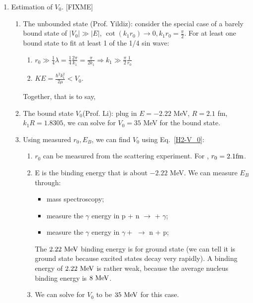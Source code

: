 \documentclass{school-22.101-notes}
\begin{document}
\begin{enumerate}
\item Estimation of $V_0$.  [FIXME] 
  \begin{enumerate}
  \item The unbounded state (Prof. Yildiz):  consider the special case of a barely bound state of $|V_0| \gg |E|$, $\cot (k_1 r_0) \to 0, k_1 r_0 = \frac{\pi}{2}$. For at least one bound state to fit at least 1 of the 1/4 sin wave: 
    \begin{enumerate}
    \item $ r_0 \gg \frac{1}{4}\lambda = \frac{1}{4}\frac{2 \pi}{k_1}  = \frac{\pi}{2k_1}  \Rightarrow k_1 \gg \frac{\pi}{2} \frac{1}{r_0} $
    \item $KE = \frac{\hbar^2 k_1^2}{2 \mu} < V_0$. 
    \end{enumerate}
    Together, that is to say,

  \item The bound state $V_0$(Prof. Li):  plug in $E = -2.22$ MeV, $R = 2.1$ fm, $k_1 R = 1.8305$, we can solve for $V_0 = 35$ MeV for the bound state. 

  \item Using measured $r_0, E_B$, we can find $V_0$ using Eq.~\ref{H2-V_0}:
    \begin{enumerate}
    \item $r_0$ can be measured from the scattering experiment. For , $r_0 = 2.1 \mathrm{fm}$. 
    \item E is the binding energy that is about $-2.22$ MeV. We can measure $E_B$ through: 
      \begin{itemize}
      \item mass spectroscopy;
      \item measure the $\gamma$ energy in p + n $\to$  + $\gamma$;
      \item measure the $\gamma$ energy in $\gamma +$  $\to$ n + p;
      \end{itemize}
      The $2.22 \mbox{ } \mathrm{MeV}$ binding energy is for ground state  (we can tell it is ground state because excited states decay very rapidly). A binding energy of $2.22 \mbox{ } \mathrm{MeV}$ is rather weak, because the average nucleus binding energy is $8 \mbox{ } \mathrm{MeV}$. 

    \item We can solve for $V_0$ to be $35 \mbox{ } \mathrm{MeV}$ for this case.
    \end{enumerate}
  \end{enumerate}



\end{enumerate}
\end{document}

